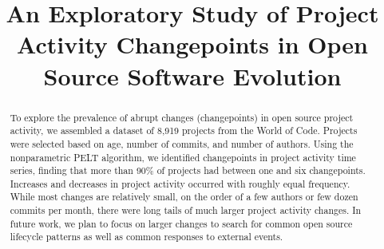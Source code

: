 \documentclass[10pt,conference]{IEEEtran}
\begin{document}
\title{An Exploratory Study of Project Activity Changepoints in Open Source Software Evolution}

\author{
\and
{}
\and
{}
}
\maketitle

\begin{abstract}
    To explore the prevalence of abrupt changes (changepoints) in open source project activity, we assembled a dataset of 8,919 projects from the World of Code. Projects were selected based on age, number of commits, and number of authors. Using the nonparametric PELT algorithm, we identified changepoints in project activity time series, finding that more than 90\% of projects had between one and six changepoints. Increases and decreases in project activity occurred with roughly equal frequency. While most changes are relatively small, on the order of a few authors or few dozen commits per month, there were long tails of much larger project activity changes. In future work, we plan to focus on larger changes to search for common open source lifecycle patterns as well as common responses to external events.
\end{abstract}
\end{document}
